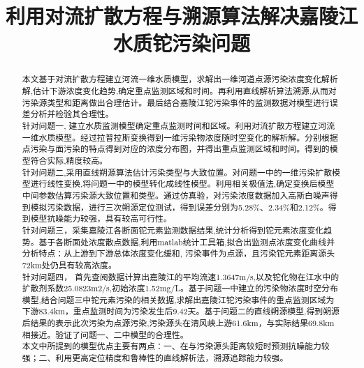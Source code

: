 \documentclass{whutmod}
\title{利用对流扩散方程与溯源算法解决嘉陵江水质铊污染问题}
\begin{document}
	
	\maketitle
	
	\begin{abstract}
本文基于对流扩散方程建立河流一维水质模型，求解出一维河道点源污染浓度变化解析解,估计下游浓度变化趋势,确定重点监测区域和时间。再利用直线解析算法溯源,从而对污染源类型和距离做出合理估计。最后结合嘉陵江铊污染事件的监测数据对模型进行误差分析并检验其合理性。
   ~\\
   
针对问题一, 建立水质监测模型确定重点监测时间和区域。利用对流扩散方程建立河流一维水质模型。经过拉普拉斯变换得到一维污染物浓度随时空变化的解析解。分别根据点污染与面污染的特点得到对应的浓度分布图，并得出重点监测区域和时间。得到的模型符合实际,精度较高。   
~\\

针对问题二,采用直线朔源算法估计污染类型与大致位置。对问题一中的一维污染扩散模型进行线性变换,将问题一中的模型转化成线性模型。利用相关极值法,确定变换后模型中间参数估算污染源大致位置和类型。通过仿真验，对污染浓度数据加入高斯白噪声得到模拟污染数据，进行三次朔源定位测试，得到误差分别为5.28\%、2.34\%和2.12\%。得到模型抗噪能力较强，具有较高可行性。
   ~\\

针对问题三，采集嘉陵江各断面铊元素监测数据结果,统计分析得到铊元素浓度变化趋势。基于各断面处浓度散点数据,利用matlab统计工具箱,拟合出监测点浓度变化曲线并分析特点：从上游到下游总体浓度变化缓和, 污染事件为点源，且污染铊元素距离源头72km处仍具有较高浓度。
   ~\\
   
针对问题四，
首先查阅数据计算出嘉陵江的平均流速1.3647m/s,以及铊化物在江水中的扩散剂系数25.0823m2/s,初始浓度1.52mg/L。基于问题一中建立的污染物浓度时空分布模型,结合问题三中铊元素污染的相关数据,求解出嘉陵江铊污染事件的重点监测区域为下游83.4km，重点监测时间为污染发生后9.42天。基于问题二的直线朔源模型,得到朔源后结果的表示此次污染为点源污染,污染源头在清风峡上游61.6km，与实际结果69.8km相接近。验证了问题一、二中模型的合理性。
   ~\\

本文中所提到的模型优点主要有两点：一、在与污染源头距离较短时预测抗噪能力较强；二、利用更高定位精度和鲁棒性的直线解析法，溯源追踪能力较强。
  
		
	\end{abstract}
	
\end{document}
